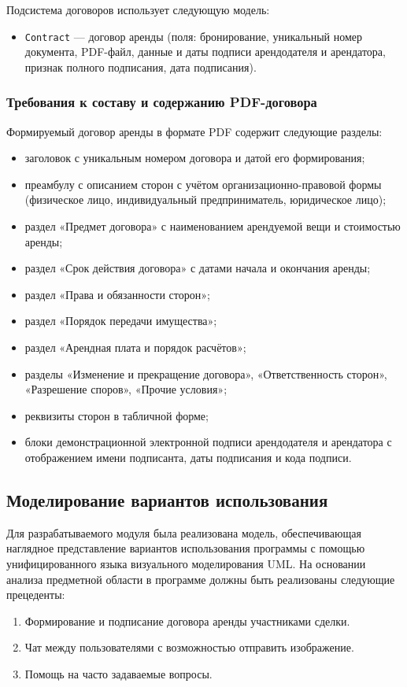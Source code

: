 Подсистема договоров использует следующую модель:
\begin{itemize}
    \item \texttt{Contract} — договор аренды (поля: бронирование, уникальный номер документа, PDF-файл, данные и даты подписи арендодателя и арендатора, признак полного подписания, дата подписания).
\end{itemize}

\subsubsection{Требования к составу и содержанию PDF-договора}

Формируемый договор аренды в формате PDF содержит следующие разделы:
\begin{itemize}
    \item заголовок с уникальным номером договора и датой его формирования;
    \item преамбулу с описанием сторон с учётом организационно-правовой формы (физическое лицо, индивидуальный предприниматель, юридическое лицо);
    \item раздел «Предмет договора» с наименованием арендуемой вещи и стоимостью аренды;
    \item раздел «Срок действия договора» с датами начала и окончания аренды;
    \item раздел «Права и обязанности сторон»;
    \item раздел «Порядок передачи имущества»;
    \item раздел «Арендная плата и порядок расчётов»;
    \item разделы «Изменение и прекращение договора», «Ответственность сторон», «Разрешение споров», «Прочие условия»;
    \item реквизиты сторон в табличной форме;
    \item блоки демонстрационной электронной подписи арендодателя и арендатора с отображением имени подписанта, даты подписания и кода подписи.
\end{itemize}

\subsection{Моделирование вариантов использования}

Для разрабатываемого модуля была реализована модель, обеспечивающая наглядное представление вариантов использования программы с помощью унифицированного языка визуального моделирования UML. На основании анализа предметной области в программе должны быть реализованы следующие прецеденты:
\begin{enumerate}
    \item Формирование и подписание договора аренды участниками сделки.
    \item Чат между пользователями с возможностью отправить изображение. 
    \item Помощь на часто задаваемые вопросы.
\end{enumerate}

